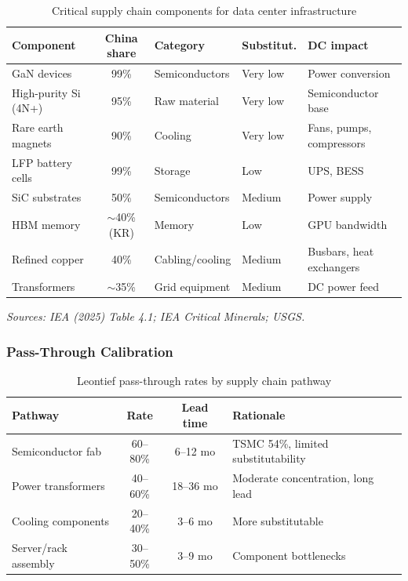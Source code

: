 \begin{table}[H]
\centering
\small
\caption{Critical supply chain components for data center infrastructure}
\label{tab:app_supply_chain}
\begin{tabular}{@{}p{3cm}cp{2.5cm}p{2cm}p{3.5cm}@{}}
\toprule
\textbf{Component} & \textbf{China share} & \textbf{Category} & \textbf{Substitut.} & \textbf{DC impact} \\
\midrule
GaN devices & 99\% & Semiconductors & Very low & Power conversion \\
High-purity Si (4N+) & 95\% & Raw material & Very low & Semiconductor base \\
Rare earth magnets & 90\% & Cooling & Very low & Fans, pumps, compressors \\
LFP battery cells & 99\% & Storage & Low & UPS, BESS \\
SiC substrates & 50\% & Semiconductors & Medium & Power supply \\
HBM memory & $\sim$40\% (KR) & Memory & Low & GPU bandwidth \\
Refined copper & 40\% & Cabling/cooling & Medium & Busbars, heat exchangers \\
Transformers & $\sim$35\% & Grid equipment & Medium & DC power feed \\
\bottomrule
\end{tabular}
\end{table}

\small\textit{Sources: IEA (2025) Table 4.1; IEA Critical Minerals; USGS.}
\normalsize

\subsubsection{Pass-Through Calibration}

\begin{table}[H]
\centering
\small
\caption{Leontief pass-through rates by supply chain pathway}
\label{tab:app_passthrough}
\begin{tabular}{@{}p{3.5cm}ccp{5cm}@{}}
\toprule
\textbf{Pathway} & \textbf{Rate} & \textbf{Lead time} & \textbf{Rationale} \\
\midrule
Semiconductor fab & 60--80\% & 6--12 mo & TSMC 54\%, limited substitutability \\
Power transformers & 40--60\% & 18--36 mo & Moderate concentration, long lead \\
Cooling components & 20--40\% & 3--6 mo & More substitutable \\
Server/rack assembly & 30--50\% & 3--9 mo & Component bottlenecks \\
\bottomrule
\end{tabular}
\end{table}

